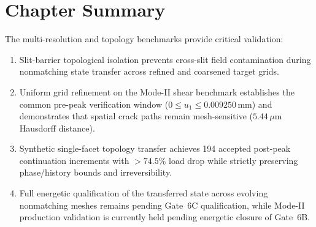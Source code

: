 \section{Chapter Summary}
\label{sec:topo_summary}

The multi-resolution and topology benchmarks provide critical validation:
\begin{enumerate}
    \item Slit-barrier topological isolation prevents cross-slit field contamination during nonmatching state transfer across refined and coarsened target grids.
    \item Uniform grid refinement on the Mode-II shear benchmark establishes the common pre-peak verification window ($0 \le u_1 \le 0.009250\,\text{mm}$) and demonstrates that spatial crack paths remain mesh-sensitive ($5.44\,\mu\text{m}$ Hausdorff distance).
    \item Synthetic single-facet topology transfer achieves 194 accepted post-peak continuation increments with $>74.5\%$ load drop while strictly preserving phase/history bounds and irreversibility.
    \item Full energetic qualification of the transferred state across evolving nonmatching meshes remains pending Gate~6C qualification, while Mode-II production validation is currently held pending energetic closure of Gate~6B.
\end{enumerate}

